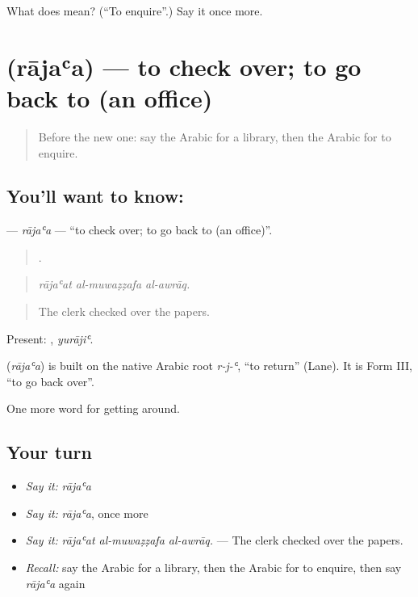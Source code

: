 \begin{tcolorbox}[breakable,colback=teal!4,colframe=teal!35!black,title={Before you move on}]
What does  mean? (\textquotedblleft{}To enquire\textquotedblright{}.) Say it once more.
\end{tcolorbox}
\section[\texorpdfstring{\ar{راجع} (rājaʿa)}{راجع (rājaʿa)}]{ (rājaʿa) — to check over; to go back to (an office)}

\label{lesson:AR-C451-rajaa-check}



\begin{quote}
Before the new one: say the Arabic for a library, then the Arabic for to enquire.
\end{quote}

\subsection*{You'll want to know: }
\textbf{} — \emph{rājaʿa} — \textquotedblleft{}to check over; to go back to (an office)\textquotedblright{}.

\begin{quote}
  .
\end{quote}

\begin{quote}
\emph{rājaʿat al-muwaẓẓafa al-awrāq.}
\end{quote}

\begin{quote}
The clerk checked over the papers.
\end{quote}

Present: , \emph{yurājiʿ}.

\begin{cousinweb}
\textbf{} (\emph{rājaʿa}) is built on the native Arabic root \emph{r-j-ʿ}, \textquotedblleft{}to return\textquotedblright{} (Lane). It is Form III, \textquotedblleft{}to go back over\textquotedblright{}.
\end{cousinweb}

\begin{grammarlens}[title={What you've built}]
One more word for getting around.
\end{grammarlens}

\subsection*{Your turn}
\begin{itemize}
\raggedright
  \item \emph{Say it:} \emph{rājaʿa}
  \item \emph{Say it:} \emph{rājaʿa}, once more
  \item \emph{Say it:} \emph{rājaʿat al-muwaẓẓafa al-awrāq.} — The clerk checked over the papers.
  \item \emph{Recall:} say the Arabic for a library, then the Arabic for to enquire, then say \emph{rājaʿa} again
\end{itemize}

